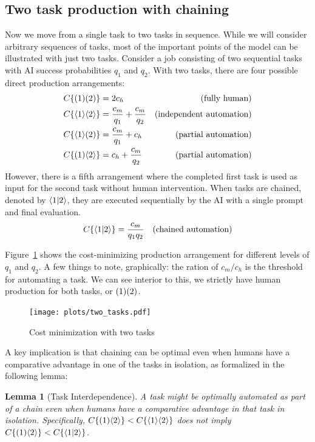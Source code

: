 \documentclass{article}
\newtheorem{lemma}[theorem]{Lemma}
\begin{document}
\subsection{Two task production with chaining}
Now we move from a single task to two tasks in sequence. 
While we will consider arbitrary sequences of tasks, most of the important points of the model can be illustrated with just two tasks.
Consider a job consisting of two sequential tasks with AI success probabilities $q_1$ and $q_2$.
With two tasks, there are four possible direct production arrangements:
\begin{align*}
    C\{ ( 1 )( 2 ) \} &= 2c_h & \text{(fully human)} \\
    C\{ \langle 1 \rangle\langle 2 \rangle \} &= \frac{c_m}{q_1} + \frac{c_m}{q_2} & \text{(independent automation)} \\
    C\{ \langle 1 \rangle( 2 ) \} &= \frac{c_m}{q_1} + c_h & \text{(partial automation)} \\
    C\{ ( 1 )\langle 2 \rangle \} &= c_h + \frac{c_m}{q_2} & \text{(partial automation)} \\
\end{align*}
However, there is a fifth arrangement where the completed first task is used as input for the second task without human intervention.
When tasks are chained, denoted by $\langle 1|2 \rangle$, they are executed sequentially by the AI with a single prompt and final evaluation.
\begin{align}
C\{ \langle 1|2 \rangle \} &= \frac{c_m}{q_1q_2} & \text{(chained automation)}
\end{align}

Figure~\ref{fig:two_tasks} shows the cost-minimizing production arrangement for different levels of $q_1$ and $q_2$.
A few things to note, graphically: the ration of $c_m / c_h$ is the threshold for automating a task. 
We can see interior to this, we strictly have human production for both tasks, or $( 1 )( 2 )$.


\begin{figure}
  \caption{Cost minimization with two tasks} \label{fig:two_tasks}
  \texttt{[image: plots/two\_tasks.pdf]}
\end{figure}

A key implication is that chaining can be optimal even when humans have a comparative advantage in one of the tasks in isolation, as formalized in the following lemma:

\begin{lemma}[Task Interdependence] \label{lemma:interdependence}
A task might be optimally automated as part of a chain even when humans have a comparative advantage in that task in isolation.
Specifically, $C\{ ( 1 )\langle 2 \rangle \} < C\{ \langle 1 \rangle\langle 2 \rangle \}$ does not imply $C\{ ( 1 )\langle 2 \rangle \} < C\{ \langle 1|2 \rangle \}$.
\end{lemma}
\end{document}
